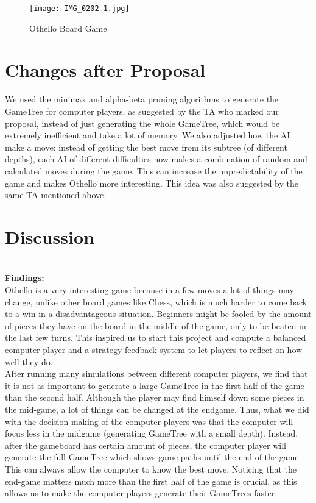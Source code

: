 \documentclass[fontsize=11pt]{article}
\begin{document}
    

    \begin{figure}[h]
            \centering
            \texttt{[image: IMG\_0202-1.jpg]}
            \caption{Othello Board Game}
            \label{fig:my_label}
        \end{figure}

\section*{Changes after Proposal}
We used the minimax and alpha-beta pruning algorithms to generate the GameTree for computer players, as suggested by the TA who marked our proposal, instead of just generating the whole GameTree, which would be extremely inefficient and take a lot of memory. We also adjusted how the AI make a move: instead of getting the best move from its subtree (of different depths), each AI of different difficulties now makes a combination of random and calculated moves during the game. This can increase the unpredictability of the game and makes Othello more interesting. This idea was also suggested by the same TA mentioned above.\\

\section*{Discussion}\\
\textbf{Findings:} \\

Othello is a very interesting game because in a few moves a lot of things may change, unlike other board games like Chess, which is much harder to come back to a win in a disadvantageous situation. Beginners might be fooled by the amount of pieces they have on the board in the middle of the game, only to be beaten in the last few turns. This inspired us to start this project and compute a balanced computer player and a strategy feedback system to let players to reflect on how well they do.\\

After running many simulations between different computer players, we find that it is not as important to generate a large GameTree in the first half of the game than the second half. Although the player may find himself down some pieces in the mid-game, a lot of things can be changed at the endgame. Thus, what we did with the decision making of the computer players was that the computer will focus less in the midgame (generating GameTree with a small depth). Instead, after the gameboard has certain amount of pieces, the computer player will generate the full GameTree which shows game paths until the end of the game. This can always allow the computer to know the best move. Noticing that the end-game matters much more than the first half of the game is crucial, as this allows us to make the computer players generate their GameTrees faster.\\
\end{document}

